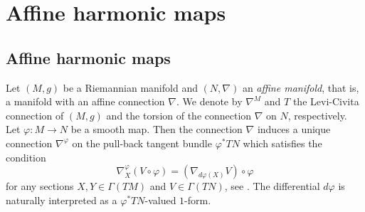\documentclass[12pt]{amsart}
\theoremstyle{definition}
\theoremstyle{remark}
\numberwithin{equation}{section}
\begin{document}
\section{Affine harmonic maps}
\label{sc:affineharmonic}
\subsection{Affine harmonic maps}
 Let $(M,g)$ be a Riemannian manifold and $(N,\nabla)$
 an \textit{affine manifold}, 
 that is, a manifold with an affine connection $\nabla$. 
 We denote by $\nabla^M$ and $T$ the Levi-Civita connection 
 of $(M,g)$ and the 
 torsion of the connection $\nabla$ on $N$, respectively.
 Let $\varphi:M\to N$ be a smooth map. 
Then 
 the connection $\nabla$
 induces a unique connection $\nabla^{\varphi}$ 
 on the pull-back tangent bundle $\varphi^{*}TN$ 
 which satisfies the condition
\begin{equation*}
\nabla^{\varphi}_{X}(V\circ{\varphi})=
(\nabla_{d\varphi(X)}V)\circ{\varphi}
\end{equation*}
 for any sections $X, Y  \in \varGamma(TM)$
 and $V\in \varGamma(TN)$, see \cite[p.~4]{EL}. 
 The differential $d\varphi$ is 
 naturally  interpreted as a $\varphi^{*}TN$-valued $1$-form. 
 
\end{document}

